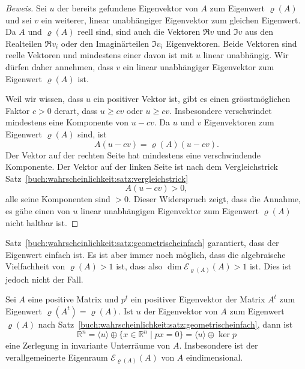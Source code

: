 \begin{proof}[Beweis]
Sei $u$ der bereits gefundene Eigenvektor von $A$ zum Eigenwert $\varrho(A)$
und sei $v$ ein weiterer, linear unabhängiger Eigenvektor zum
gleichen Eigenwert.
Da $A$ und $\varrho(A)$ reell sind, sind auch die Vektoren $\Re v$ und $\Im v$
aus den Realteilen $\Re v_i$ oder den Imaginärteilen $\Im v_i$ Eigenvektoren.
Beide Vektoren sind reelle Vektoren und mindestens einer davon ist mit
$u$ linear unabhängig.
Wir dürfen daher annehmen, dass $v$ ein linear unabhängiger Eigenvektor
zum Eigenwert $\varrho(A)$ ist.

Weil wir wissen, dass $u$ ein positiver Vektor ist, gibt es einen
grösstmöglichen Faktor $c>0$ derart, dass $u\ge cv$ oder $u\ge cv$.
Insbesondere verschwindet mindestens eine Komponente von $u-cv$.
Da $u$ und $v$ Eigenvektoren zum Eigenwert $\varrho(A)$ sind,
ist 
\[
A(u-cv)
=
\varrho(A)(u-cv).
\]
Der Vektor auf der rechten Seite hat mindestens eine verschwindende 
Komponente.
Der Vektor auf der linken Seite ist nach dem Vergleichstrick
Satz~\ref{buch:wahrscheinlichkeit:satz:vergleichstrick}
\[
A(u-cv) > 0,
\]
alle seine Komponenten sind $>0$.
Dieser Widerspruch zeigt, dass die Annahme, es gäbe einen von $u$ linear 
unabhängigen Eigenvektor zum Eigenwert $\varrho(A)$ nicht haltbar ist.
\end{proof}

Satz~\ref{buch:wahrscheinlichkeit:satz:geometrischeinfach} garantiert,
dass der Eigenwert einfach ist.
Es ist aber immer noch möglich, dass die algebraische Vielfachheit
von $\varrho(A) >1$ ist, dass also $\dim\mathcal{E}_{\varrho(A)}(A)>1$
ist.
Dies ist jedoch nicht der Fall.

\begin{satz}
\label{buch:wahrscheinlichkeit:satz:algebraischeinfach}
Sei $A$ eine positive Matrix und $p^t$ ein positiver Eigenvektor
der Matrix $A^t$ zum Eigenwert $\varrho(A^t)=\varrho(A)$.
Ist $u$ der Eigenvektor von $A$ zum Eigenwert $\varrho(A)$ nach
Satz~\ref{buch:wahrscheinlichkeit:satz:geometrischeinfach},
dann ist
\[
\mathbb{R}^n
=
\langle u\rangle
\oplus
\{ x\in\mathbb{R}^n\;|\; px=0\}
=
\langle u\rangle
\oplus
\ker p
\]
eine Zerlegung in invariante Unterräume von $A$.
Insbesondere ist der verallgemeinerte Eigenraum $\mathcal{E}_{\varrho(A)}(A)$
von $A$ eindimensional.
\end{satz}

